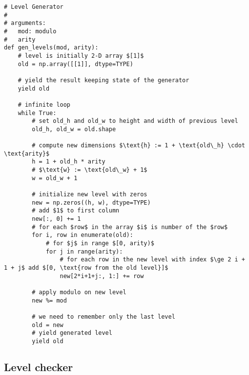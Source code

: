\documentclass{article}
\begin{document}
\begin{verbatim}
# Level Generator
#
# arguments:
#   mod: modulo
#   arity
def gen_levels(mod, arity):
    # level is initially 2-D array $[1]$
    old = np.array([[1]], dtype=TYPE)

    # yield the result keeping state of the generator
    yield old

    # infinite loop
    while True:
        # set old_h and old_w to height and width of previous level
        old_h, old_w = old.shape

        # compute new dimensions $\text{h} := 1 + \text{old\_h} \cdot \text{arity}$
        h = 1 + old_h * arity
        # $\text{w} := \text{old\_w} + 1$
        w = old_w + 1

        # initialize new level with zeros
        new = np.zeros((h, w), dtype=TYPE)
        # add $1$ to first column
        new[:, 0] += 1
        # for each $row$ in the array $i$ is number of the $row$
        for i, row in enumerate(old):
            # for $j$ in range $[0, arity)$
            for j in range(arity):
                # for each row in the new level with index $\ge 2 i + 1 + j$ add $[0, \text{row from the old level}]$
                new[2*i+1+j:, 1:] += row

        # apply modulo on new level
        new %= mod

        # we need to remember only the last level
        old = new
        # yield generated level
        yield old
\end{verbatim}

\subsection{Level checker}
\end{document}
